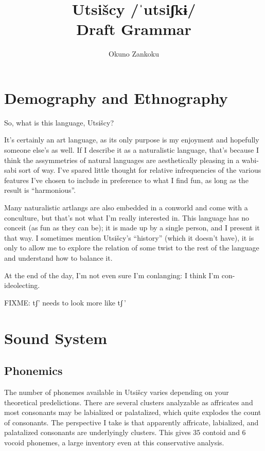 \documentclass[12pt]{book} %
\title{Utsišcy /ˈutsiʃkɨ/ \\ {\Large Draft Grammar}}
\author{Okuno Zankoku}
\begin{document}
\maketitle





\chapter{Demography and Ethnography}
So, what is this language, Utsišcy?

It's certainly an art language, as its only purpose is my enjoyment and hopefully someone else's as well.
If I describe it as a naturalistic language, that's because I think the assymmetries of natural languages are aesthetically pleasing in a wabi-sabi sort of way.
I've spared little thought for relative infrequencies of the various features I've chosen to include in preference to what I find fun, as long as the result is ``harmonious''.

Many naturalistic artlangs are also embedded in a conworld and come with a conculture, but that's not what I'm really interested in.
This language has no conceit (as fun as they can be); it is made up by a single person, and I present it that way.
I sometimes mention Utsišcy's ``history'' (which it doesn't have), it is only to allow me to explore the relation of some twist to the rest of the language and understand how to balance it.

At the end of the day, I'm not even sure I'm conlanging: I think I'm con-ideolecting.


FIXME: tʃ' needs to look more like tʃ\,'


\chapter{Sound System}

\section{Phonemics}

The number of phonemes available in Utsišcy varies depending on your theoretical predelictions.
There are several clusters analyzable as affricates and most consonants may be labialized or palatalized, which quite explodes the count of consonants.
The perspective I take is that apparently affricate, labialized, and palatalized consonants are underlyingly clusters.
This gives 35 contoid and 6 vocoid phonemes, a large inventory even at this conservative analysis.
\end{document}
